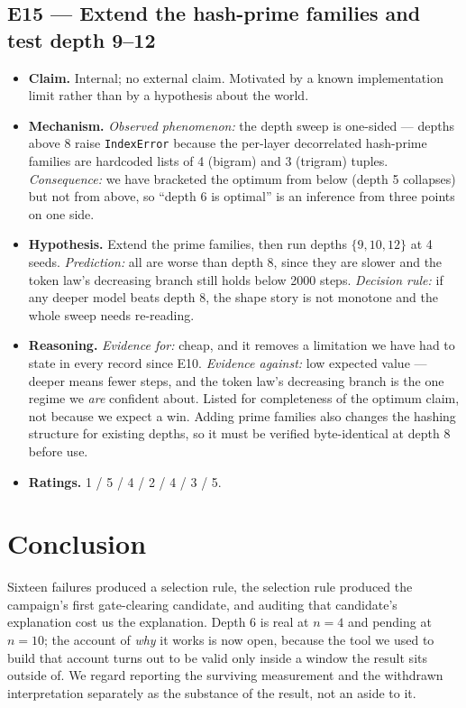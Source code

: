 \documentclass{article}
\begin{document}
\subsection{E15 --- Extend the hash-prime families and test depth 9--12}
\begin{itemize}\itemsep2pt
\item \textbf{Claim.} Internal; no external claim. Motivated by a known implementation limit rather than by a hypothesis about the world.
\item \textbf{Mechanism.} \emph{Observed phenomenon:} the depth sweep is one-sided --- depths above 8 raise \texttt{IndexError} because the per-layer decorrelated hash-prime families are hardcoded lists of 4 (bigram) and 3 (trigram) tuples. \emph{Consequence:} we have bracketed the optimum from below (depth 5 collapses) but not from above, so ``depth 6 is optimal'' is an inference from three points on one side.
\item \textbf{Hypothesis.} Extend the prime families, then run depths $\{9, 10, 12\}$ at 4 seeds. \emph{Prediction:} all are worse than depth 8, since they are slower and the token law's decreasing branch still holds below 2000 steps. \emph{Decision rule:} if any deeper model beats depth 8, the shape story is not monotone and the whole sweep needs re-reading.
\item \textbf{Reasoning.} \emph{Evidence for:} cheap, and it removes a limitation we have had to state in every record since E10. \emph{Evidence against:} low expected value --- deeper means fewer steps, and the token law's decreasing branch is the one regime we \emph{are} confident about. Listed for completeness of the optimum claim, not because we expect a win. Adding prime families also changes the hashing structure for existing depths, so it must be verified byte-identical at depth 8 before use.
\item \textbf{Ratings.} 1 / 5 / 4 / 2 / 4 / 3 / 5.
\end{itemize}

\section{Conclusion}
Sixteen failures produced a selection rule, the selection rule produced the campaign's first gate-clearing candidate, and auditing that candidate's explanation cost us the explanation. Depth 6 is real at $n{=}4$ and pending at $n{=}10$; the account of \emph{why} it works is now open, because the tool we used to build that account turns out to be valid only inside a window the result sits outside of. We regard reporting the surviving measurement and the withdrawn interpretation separately as the substance of the result, not an aside to it.
\end{document}
